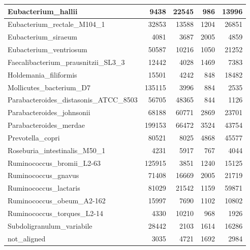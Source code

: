 \documentclass[12pt,a4paper]{article}
\begin{document}
\begin{table}[ht]
\begin{center}
\begin{tabular}{|l*{4}{|r}|}
Eubacterium\_hallii & 9438 & 22545 & 986 & 13996 \\ \hline
Eubacterium\_rectale\_M104\_1 & 32853 & 13588 & 1204 & 26851 \\ \hline
Eubacterium\_siraeum & 4081 & 3687 & 2005 & 4859 \\ \hline
Eubacterium\_ventriosum & 50587 & 10216 & 1050 & 21252 \\ \hline
Faecalibacterium\_prausnitzii\_SL3\_3 & 12442 & 4028 & 1469 & 7383 \\ \hline
Holdemania\_filiformis & 15501 & 4242 & 848 & 18482 \\ \hline
Mollicutes\_bacterium\_D7 & 135115 & 3996 & 884 & 2535 \\ \hline
Parabacteroides\_distasonis\_ATCC\_8503 & 56705 & 48365 & 844 & 1126 \\ \hline
Parabacteroides\_johnsonii & 68188 & 60771 & 2869 & 23701 \\ \hline
Parabacteroides\_merdae & 199153 & 66472 & 3524 & 43754 \\ \hline
Prevotella\_copri & 80521 & 8025 & 4868 & 45577 \\ \hline
Roseburia\_intestinalis\_M50\_1 & 4231 & 5917 & 767 & 4044 \\ \hline
Ruminococcus\_bromii\_L2-63 & 125915 & 3851 & 1240 & 15125 \\ \hline
Ruminococcus\_gnavus & 71408 & 16669 & 2005 & 21719 \\ \hline
Ruminococcus\_lactaris & 81029 & 21542 & 1159 & 59871 \\ \hline
Ruminococcus\_obeum\_A2-162 & 15997 & 7690 & 1102 & 10802 \\ \hline
Ruminococcus\_torques\_L2-14 & 4330 & 10210 & 968 & 1926 \\ \hline
Subdoligranulum\_variabile & 28442 & 2103 & 1614 & 16286 \\ \hline
not\_aligned & 3035 & 4721 & 1692 & 2984 \\ \hline
\end{tabular}
\end{center}
\end{table}
\end{document}
